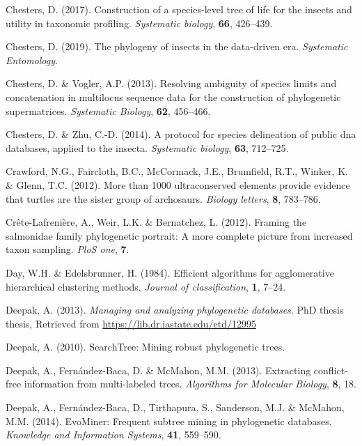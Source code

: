 \documentclass[]{article}
\begin{document}
\leavevmode\hypertarget{ref-chesters2017construction}{}%
Chesters, D. (2017). Construction of a species-level tree of life for the insects and utility in taxonomic profiling. \emph{Systematic biology}, \textbf{66}, 426--439.

\leavevmode\hypertarget{ref-chesters2019phylogeny}{}%
Chesters, D. (2019). The phylogeny of insects in the data-driven era. \emph{Systematic Entomology}.

\leavevmode\hypertarget{ref-chesters2013resolving}{}%
Chesters, D. \& Vogler, A.P. (2013). Resolving ambiguity of species limits and concatenation in multilocus sequence data for the construction of phylogenetic supermatrices. \emph{Systematic Biology}, \textbf{62}, 456--466.

\leavevmode\hypertarget{ref-chesters2014protocol}{}%
Chesters, D. \& Zhu, C.-D. (2014). A protocol for species delineation of public dna databases, applied to the insecta. \emph{Systematic biology}, \textbf{63}, 712--725.

\leavevmode\hypertarget{ref-crawford2012more}{}%
Crawford, N.G., Faircloth, B.C., McCormack, J.E., Brumfield, R.T., Winker, K. \& Glenn, T.C. (2012). More than 1000 ultraconserved elements provide evidence that turtles are the sister group of archosaurs. \emph{Biology letters}, \textbf{8}, 783--786.

\leavevmode\hypertarget{ref-crete2012salmonidae}{}%
Crête-Lafrenière, A., Weir, L.K. \& Bernatchez, L. (2012). Framing the salmonidae family phylogenetic portrait: A more complete picture from increased taxon sampling. \emph{PloS one}, \textbf{7}.

\leavevmode\hypertarget{ref-day1984efficient}{}%
Day, W.H. \& Edelsbrunner, H. (1984). Efficient algorithms for agglomerative hierarchical clustering methods. \emph{Journal of classification}, \textbf{1}, 7--24.

\leavevmode\hypertarget{ref-deepak2013managing}{}%
Deepak, A. (2013). \emph{Managing and analyzing phylogenetic databases}. PhD thesis thesis, Retrieved from \url{https://lib.dr.iastate.edu/etd/12995}

\leavevmode\hypertarget{ref-deepak2010searchtree}{}%
Deepak, A. (2010). SearchTree: Mining robust phylogenetic trees.

\leavevmode\hypertarget{ref-deepak2013extracting}{}%
Deepak, A., Fernández-Baca, D. \& McMahon, M.M. (2013). Extracting conflict-free information from multi-labeled trees. \emph{Algorithms for Molecular Biology}, \textbf{8}, 18.

\leavevmode\hypertarget{ref-deepak2014evominer}{}%
Deepak, A., Fernández-Baca, D., Tirthapura, S., Sanderson, M.J. \& McMahon, M.M. (2014). EvoMiner: Frequent subtree mining in phylogenetic databases. \emph{Knowledge and Information Systems}, \textbf{41}, 559--590.
\end{document}
